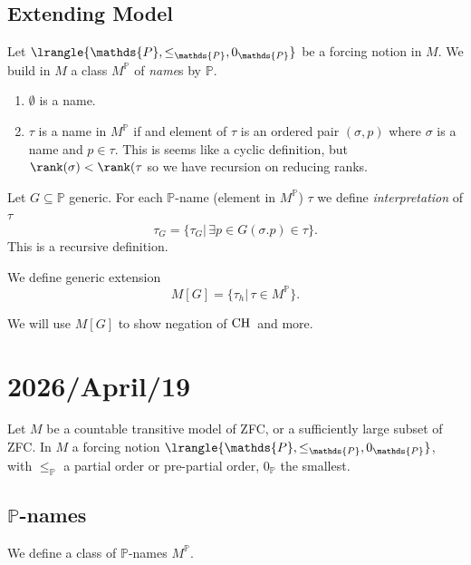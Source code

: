 \documentclass[11pt,pdftex,twoside,a4paper]{article}
\newcommand{\CH}{\ensuremath{\mathop{\rm CH}\nolimits}}
\newcommand{\dsP}{\ensuremath{\mathds{P}}}
\theoremstyle{definition}
\begin{document}
\subsection{Extending Model}

Let \(\lrangle{\dsP,\leq_\dsP,0_\dsP}\) be a forcing notion in $M$.
We build in $M$ a class \(M^\dsP\) of \emph{name}s by \dsP.
\begin{enumerate}
\item \(\emptyset\) is a name.
\item \(\tau\) is a name in \(M^\dsP\) if and element of \(\tau\)
   is an ordered pair \((\sigma,p)\) where \(\sigma\) is a name and
  \(p\in \tau\). This is seems like a cyclic definition, but
  \(\rank(\sigma)<\rank(\tau\) so we have recursion on reducing ranks.
\end{enumerate}

Let \(G\subseteq \dsP\) generic. For each \dsP-name (element in \(M^\dsP\))
\(\tau\) we define \emph{interpretation} of \(\tau\)
\begin{equation*}
\tau_G = \{\tau_G|\,\exists p\in G (\sigma.p)\in \tau\}.
\end{equation*}
This is a recursive definition.

We define generic extension
\begin{equation*}
M[G] = \{\tau_h|\, \tau\in M^\dsP\}.
\end{equation*}

We will use \(M[G]\) to show negation of \CH\ and more.

\section{2026/April/19}

Let $M$ be a countable transitive model of ZFC,
or a sufficiently large subset of ZFC.
In $M$ a forcing notion \(\lrangle{\dsP,\leq_\dsP,0_\dsP}\),
with \(\leq_\dsP\) a partial order or pre-partial order,
\(0_\dsP\) the smallest.

\subsection{\dsP-names}

We define a class of \dsP-names \(M^\dsP\).
\end{document}
